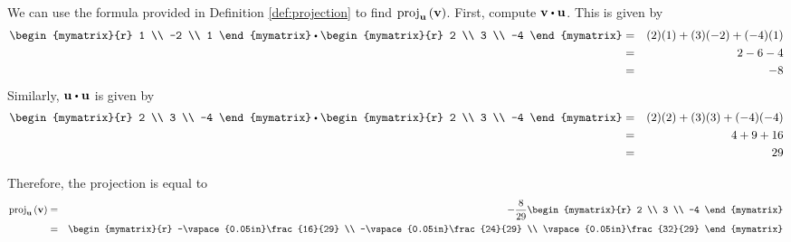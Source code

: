 \begin{solution}
We can use the formula provided in Definition \ref{def:projection} to find $\mbox{proj}_{{\bf u}}\left({\bf v}\right)$.
First, compute $\vect{v} \dotprod \vect{u}$. 
This is given by 
\begin{eqnarray*}
\begin{mymatrix}{r}
1 \\
-2 \\
1
\end{mymatrix}
 \dotprod
\begin{mymatrix}{r}
2 \\
3 \\
-4
\end{mymatrix}
&=&
(2)(1) + (3)(-2) + (-4)(1) \\
&=& 
2 - 6 - 4 \\
&=& -8
\end{eqnarray*}
Similarly, $\vect{u} \dotprod \vect{u}$ is given by 
\begin{eqnarray*}
\begin{mymatrix}{r}
2 \\
3 \\
-4 
\end{mymatrix}
 \dotprod
\begin{mymatrix}{r}
2 \\
3 \\
-4
\end{mymatrix}
&=&
(2)(2) + (3)(3) + (-4)(-4) \\
&=& 
4 + 9 + 16 \\
&=& 29
\end{eqnarray*}

Therefore, the projection is equal to  
\begin{eqnarray*}
\func{proj}_{\vect{u}}\tup{\vect{v}}
&=&-\frac{8}{29} 
\begin{mymatrix}{r}
2 \\
3 \\
-4
\end{mymatrix} \\
&=& 
\begin{mymatrix}{r}
-\vspace{0.05in}\frac{16}{29} \\
-\vspace{0.05in}\frac{24}{29} \\
\vspace{0.05in}\frac{32}{29}
\end{mymatrix}
\end{eqnarray*}
\end{solution}

